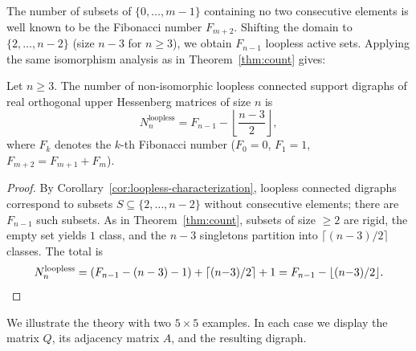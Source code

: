 
The number of subsets of $\{0, \dots, m-1\}$ containing no two consecutive
elements is well known to be the Fibonacci number $F_{m+2}$. Shifting the
domain to $\{2, \dots, n-2\}$ (size $n - 3$ for $n \ge 3$), we obtain
$F_{n-1}$ loopless active sets. Applying the same isomorphism analysis as in
Theorem~\ref{thm:count} gives:

\begin{theorem}\label{thm:loopless-nonisomorphic}
Let $n \ge 3$. The number of non-isomorphic loopless connected support digraphs
of real orthogonal upper Hessenberg matrices of size $n$ is
\[
N_n^{\mathrm{loopless}}
= F_{n-1} - \left\lfloor \frac{n-3}{2} \right\rfloor,
\]
where $F_k$ denotes the $k$-th Fibonacci number ($F_0 = 0$, $F_1 = 1$,
$F_{m+2} = F_{m+1} + F_m$).
\end{theorem}
\begin{proof}
By Corollary~\ref{cor:loopless-characterization}, loopless connected digraphs
correspond to subsets $S \subseteq \{2, \dots, n-2\}$ without consecutive
elements; there are $F_{n-1}$ such subsets. As in Theorem~\ref{thm:count},
subsets of size $\ge 2$ are rigid, the empty set yields $1$ class, and the
$n - 3$ singletons partition into $\lceil(n-3)/2\rceil$ classes. The total is
\[
N_n^{\mathrm{loopless}}
= (F_{n-1} - (n-3) - 1) + \lceil(n{-}3)/2\rceil + 1
= F_{n-1} - \lfloor(n{-}3)/2\rfloor. \qedhere
\]
\end{proof}


We illustrate the theory with two $5 \times 5$ examples. In each case we display the matrix $Q$, its adjacency matrix $A$, and the resulting digraph.

